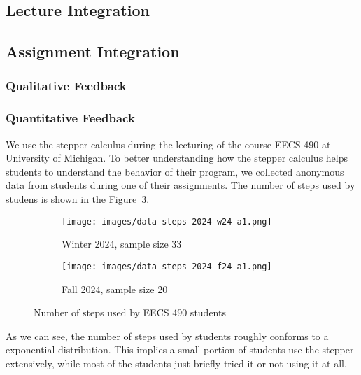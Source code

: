 
\subsection{Lecture Integration}

\subsection{Assignment Integration}

\subsubsection{Qualitative Feedback}

\subsubsection{Quantitative Feedback}

We use the stepper calculus during the lecturing of the course EECS
490 at University of Michigan. To better understanding how the stepper
calculus helps students to understand the behavior of their program,
we collected anonymous data from students during one of their
assignments. The number of steps used by studens is shown in the
Figure~\ref{fig:eval-num-steps}.

\begin{figure}[h]
  \centering
  \begin{minipage}{.40\linewidth}
    \begin{subfigure}{\linewidth}
      \texttt{[image: images/data-steps-2024-w24-a1.png]}
      \caption{Winter 2024, sample size 33}
      \label{fig:eval-num-steps-w24}
    \end{subfigure}
  \end{minipage}
  \quad
  \begin{minipage}{.40\linewidth}
    \begin{subfigure}{\linewidth}
      \texttt{[image: images/data-steps-2024-f24-a1.png]}
      \caption{Fall 2024, sample size 20}
      \label{fig:eval-num-steps-f24}
    \end{subfigure}
  \end{minipage}
  \caption{Number of steps used by EECS 490 students}
  \label{fig:eval-num-steps}
\end{figure}

As we can see, the number of steps used by students roughly conforms
to a exponential distribution. This implies a small portion of
students use the stepper extensively, while most of the students just
briefly tried it or not using it at all.

